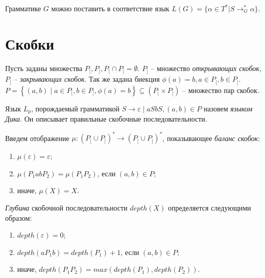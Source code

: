 Грамматике $G$ можно поставить в соответствие язык $L(G) = \{ \alpha \in T^* | S \rightarrow_G^* \alpha \}$. 

\section{Скобки}


Пусть заданы множества $P_[, P_], P_[ \cap P_] = \emptyset$. 
$P_[$ -- множество \emph{открывающих скобок}, $P_]$ -- \emph{закрывающих скобок}.
Так же задана биекция $\phi(a) = b, a \in P_[, b \in P_]$.
$P = \left\{ (a, b) \mid a \in P_[, b \in P_], \phi(a) = b \right\} \subseteq \left( P_[ \times P_] \right)$ -- множество пар скобок.

Язык $L_p$, порождаемый грамматикой $S \rightarrow \varepsilon \mid a S b S, (a, b) \in P$ назовем \emph{языком Дика}. 
Он описывает правильные скобочные последовательности.

Введем отображение $\mu : (P_[ \cup P_])^* \to (P_[ \cup P_])^* $, показывающее \emph{баланс скобок}:
\begin{enumerate}[label=\arabic*)]
    \item $\mu(\varepsilon) = \varepsilon$;
    \item $\mu(P_1 a b P_2) = \mu(P_1 P_2)$, если $(a, b) \in P$;
    \item иначе, $\mu(X) = X$.
\end{enumerate}

\emph{Глубина} скобочной последовательности $depth(X)$ определяется следующими образом:
\begin{enumerate}[label=\arabic*)]
    \item $depth(\varepsilon) = 0$;
    \item $depth(a P_1 b) = depth(P_1) + 1$, если $(a, b) \in P$;
    \item иначе, $depth(P_1 P_2) = max(depth(P_1), depth(P_2))$.
\end{enumerate}

